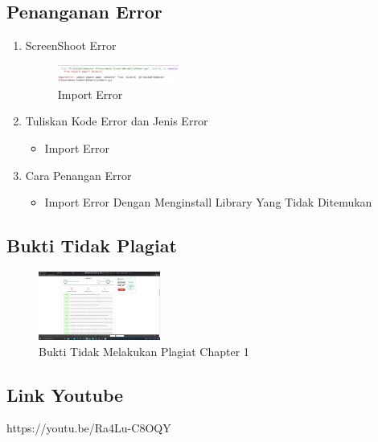 \subsection{Penanganan Error}
\begin{enumerate}
	\item ScreenShoot Error
	\begin{figure}[H]
		\includegraphics[width=4cm]{figures/1174073/1/error/1.png}
		\centering
		\caption{Import Error}
	\end{figure}

	\item Tuliskan Kode Error dan Jenis Error
	\begin{itemize}
		\item Import Error
	\end{itemize}
	\item Cara Penangan Error
	\begin{itemize}
		\item Import Error
		\hfill\break
		Dengan Menginstall Library Yang Tidak Ditemukan
	\end{itemize}
\end{enumerate}

\subsection{Bukti Tidak Plagiat}
\begin{figure}[H]
	\includegraphics[width=4cm]{figures/1174073/1/plagiat/plagiat.PNG}
	\centering
	\caption{Bukti Tidak Melakukan Plagiat Chapter 1}
\end{figure}

\subsection{Link Youtube}
https://youtu.be/Ra4Lu-C8OQY

